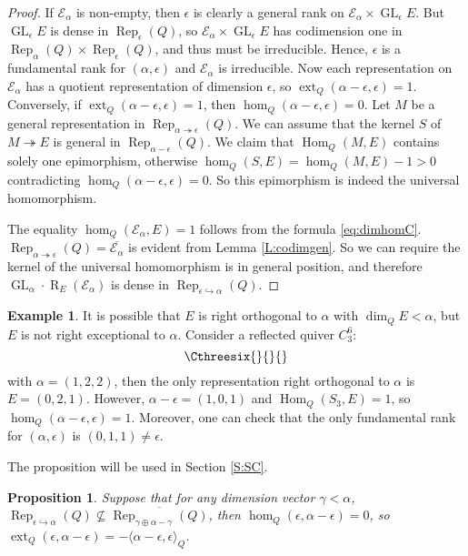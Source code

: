 \documentclass{amsart}
\newtheorem{proposition}[theorem]{Proposition}
\theoremstyle{definition}
\newtheorem{example}[theorem]{Example}
\theoremstyle{remark}
\numberwithin{equation}{section}
\begin{document}
\begin{proof} If ${\mathcal{{E}}}_\alpha$ is non-empty, then $\epsilon$ is clearly a general rank on ${\mathcal{{E}}}_\alpha\times {\operatorname{GL}}_\epsilon E$. But ${\operatorname{GL}}_\epsilon E$ is dense in ${\operatorname{Rep}}_\epsilon(Q)$, so ${\mathcal{{E}}}_\alpha\times {\operatorname{GL}}_\epsilon E$ has codimension one in ${\operatorname{Rep}}_\alpha(Q)\times {\operatorname{Rep}}_\epsilon(Q)$, and thus must be irreducible. Hence, $\epsilon$ is a fundamental rank for $(\alpha,\epsilon)$ and ${\mathcal{{E}}}_\alpha$ is irreducible. Now each representation on ${\mathcal{{E}}}_\alpha$ has a quotient representation of dimension $\epsilon$, so ${\operatorname{ext}}_Q(\alpha-\epsilon,\epsilon)=1$.
Conversely, if ${\operatorname{ext}}_Q(\alpha-\epsilon,\epsilon)=1$, then $\hom_Q(\alpha-\epsilon,\epsilon)=0$. Let $M$ be a general representation in ${\operatorname{Rep}}_{\alpha\twoheadrightarrow\epsilon}(Q)$. We can assume that the kernel $S$ of $M\twoheadrightarrow E$ is general in ${\operatorname{Rep}}_{\alpha-\epsilon}(Q)$.
We claim that ${\operatorname{Hom}}_Q(M,E)$ contains solely one epimorphism, otherwise $\hom_Q(S,E)=\hom_Q(M,E)-1>0$ contradicting $\hom_Q(\alpha-\epsilon,\epsilon)=0$. So this epimorphism is indeed the universal homomorphism.

The equality $\hom_Q({\mathcal{{E}}}_\alpha,E)=1$ follows from the formula \eqref{eq:dimhomC}. ${\operatorname{Rep}}_{\alpha\twoheadrightarrow\epsilon}(Q)=\overline{{\mathcal{{E}}}_\alpha}$ is evident from Lemma \ref{L:codimgen}. So we can require the kernel of the universal homomorphism is in general position, and therefore ${\operatorname{GL}}_\alpha\cdot{\operatorname{R}}_E({\mathcal{{E}}}_\alpha)$ is dense in ${\operatorname{Rep}}_{\epsilon\hookrightarrow\alpha}(Q)$.
\end{proof}

\begin{example} \label{Ex:0} It is possible that $E$ is right orthogonal to $\alpha$ with $\dim_Q E<\alpha$, but $E$ is not right exceptional to $\alpha$. Consider a reflected quiver $C_3^6:$ $$\Cthreesix{}{}{}$$ with $\alpha=(1,2,2)$, then the only representation right orthogonal to $\alpha$ is $E=(0,2,1)$. However, $\alpha-\epsilon=(1,0,1)$ and ${\operatorname{Hom}}_Q(S_3,E)=1$, so $\hom_Q(\alpha-\epsilon,\epsilon)=1$. Moreover, one can check that the only fundamental rank for $(\alpha,\epsilon)$ is $(0,1,1)\neq\epsilon$.
\end{example}

The proposition will be used in Section \ref{S:SC}.
\begin{proposition} \label{P:dimblowup} Suppose that for any dimension vector $\gamma<\alpha$, ${\operatorname{Rep}}_{\epsilon\hookrightarrow\alpha}(Q)\nsubseteq \overline{{\operatorname{Rep}}_{\gamma\oplus\alpha-\gamma}(Q)}$, then
$\hom_Q(\epsilon,\alpha-\epsilon)=0$, so ${\operatorname{ext}}_Q(\epsilon,\alpha-\epsilon)=-{\langle{\alpha-\epsilon,\epsilon}\rangle}_Q$.
\end{proposition}
\end{document}
